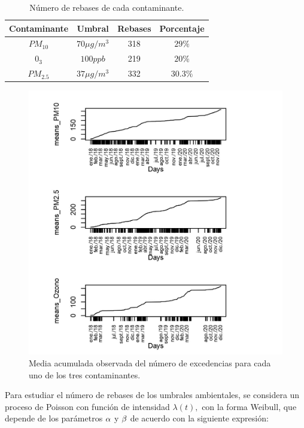 \begin{table}[!h]
\begin{center}
\begin{tabular}{|c|c|c|c|}
\hline
Contaminante & Umbral & Rebases & Porcentaje \\
\hline \hline
$PM_{10}$ & $70\mu g /m^3$ &  318  & $29\%$ \\ \hline
$0_3$& $100 ppb$ &  219 & $20\%$  \\ \hline
$PM_{2.5}$ & $37\mu g /m^3$ & 332 & $30.3 \%$  \\ \hline
\end{tabular}
\caption{Número de rebases de cada contaminante.}
\label{rebasesporcontaminante}
\end{center}
\end{table}


 
\begin{figure}[!t]
\begin{center}
\includegraphics[scale=1.5]{mediasacumuladas}
\end{center}
\centering
\caption{Media acumulada observada del número de excedencias para cada uno de los tres contaminantes.}
\label{mediasacum}
\end{figure}

Para estudiar el número de rebases de los umbrales ambientales, se considera un proceso de Poisson con función de intensidad $\lambda (t),$ con la forma Weibull, que depende de los parámetros $\alpha$ y $\beta$ de acuerdo con la siguiente expresión: 

